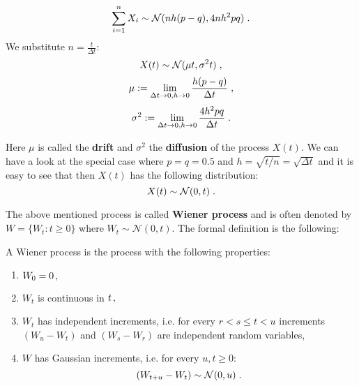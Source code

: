 \documentclass[times, utf8, diplomski]{fer}
\begin{document}
\begin{equation}
	\sum_{i=1}^n X_i \sim \mathcal{N}(nh(p-q), 4nh^2pq)\hspace{0.1cm}.
\end{equation}
We substitute $n=\frac{t}{\Delta t}$:
\begin{equation}
	X(t) \sim \mathcal{N}(\mu t, \sigma^2t)\hspace{0.1cm},
\end{equation}
\begin{equation}
	\mu := \lim_{\Delta t \to 0, h \to 0} \frac{h(p-q)}{\Delta t}\hspace{0.1cm},
\end{equation}
\begin{equation}
	\sigma^2 := \lim_{\Delta t \to 0, h \to 0} \frac{4h^2pq}{\Delta t}\hspace{0.1cm}.
\end{equation}

\noindent Here $\mu$ is called the \textbf{drift} and $\sigma^2$ the \textbf{diffusion} of the process $X(t)$. We can have a look at the special case where $p=q=0.5$ and $h=\sqrt{t/n}=\sqrt{\Delta t}$ and it is easy to see that then $X(t)$ has the following distribution:
\begin{equation} 
	X(t) \sim \mathcal{N}(0, t)\hspace{0.1cm}.
\end{equation}	

\noindent The above mentioned process is called \textbf{Wiener process} and is often denoted by $W = \{W_t:t\ge 0\}$ where $W_t \sim \mathcal{N}(0,t)$. The formal definition is the following:

\begin{definition}
A Wiener process is the process with the following properties:
\begin{enumerate}
	\item $W_0 = 0\hspace{0.05cm},$
	\item $W_t$ is continuous in $t\hspace{0.05cm},$
	\item $W_t$ has independent increments, i.e. for every $r < s \leq t < u$ increments $(W_u - W_t)$ and $(W_s - W_r)$ are independent random variables,
	\item $W$ has Gaussian increments, i.e. for every $u,t \geq 0$: 
		\begin{equation}(W_{t+u} - W_t) \sim \mathcal{N}(0,u)\hspace{0.1cm}. \end{equation}
\end{enumerate}
\end{definition}
\end{document}
